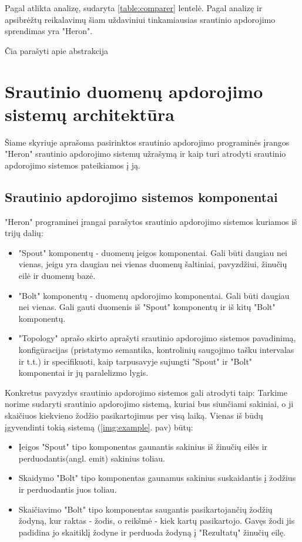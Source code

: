 \documentclass{VUMIFPSbakalaurinis}
\begin{document}
Pagal atlikta analizę, sudaryta \ref{table:comparer} lentelė. Pagal analizę ir apsibrėžtų reikalavimų šiam uždaviniui tinkamiausias srautinio apdorojimo sprendimas yra "Heron". \par
Čia parašyti apie abstrakcija \par
 
\section{Srautinio duomenų apdorojimo sistemų architektūra}

Šiame skyriuje aprašoma pasirinktos srautinio apdorojimo programinės įrangos "Heron" srautinio apdorojimo sistemų užrašymą ir kaip turi atrodyti srautinio apdorojimo sistemos pateikiamos į ją.

\subsection{Srautinio apdorojimo sistemos komponentai}
"Heron" programinei įrangai parašytos srautinio apdorojimo sistemos kuriamos iš trijų dalių:
\begin{itemize}
    \item "Spout" komponentų - duomenų įeigos komponentai. Gali būti daugiau nei vienas, jeigu yra daugiau nei vienas duomenų šaltiniai, pavyzdžiui, žinučių eilė ir duomenų bazė.
    \item "Bolt" komponentų - duomenų apdorojimo komponentai. Gali būti daugiau nei vienas. Gali gauti duomenis iš "Spout" komponentų ir iš kitų "Bolt" komponentų.
    \item "Topology" aprašo skirto aprašyti srautinio apdorojimo sistemos pavadinimą, konfigūracijas (pristatymo semantika, kontrolinių saugojimo tašku intervalas ir t.t.) ir specifikuoti, kaip tarpusavyje sujungti "Spout" ir "Bolt" komponentai ir jų paralelizmo lygis. 
\end{itemize}
Konkretus pavyzdys srautinio apdorojimo sistemos gali atrodyti taip:
Tarkime norime sudaryti srautinio apdorojimo sistemą, kuriai bus siunčiami sakiniai, o ji skaičiuos kiekvieno žodžio pasikartojimus per visą laiką. Vienas iš būdų įgyvendinti tokią sistemą (\ref{img:example}. pav) būtų:
\begin{itemize}
    \item Įeigos "Spout" tipo komponentas gaunantis sakinius iš žinučių eilės ir perduodantis(angl. emit) sakinius toliau.
    \item Skaidymo "Bolt" tipo komponentas gaunamus sakinius suskaidantis į žodžius ir perduodantis juos toliau.
    \item Skaičiavimo "Bolt" tipo komponentas saugantis pasikartojančių žodžių žodyną, kur raktas - žodis, o reikšmė - kiek kartų pasikartojo. Gavęs žodi jis padidina jo skaitiklį žodyne ir perduoda žodyną į "Rezultatų" žinučių eilę.
\end{itemize}
\end{document}

